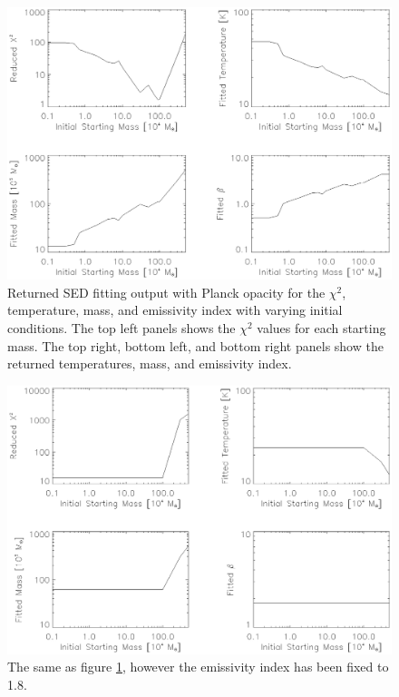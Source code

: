 \begin{figure}
  \centering
  \includegraphics[width=1.\textwidth]{sed_imgs/beta_f_return.eps}
  \caption[Initial Mass Dependence and Convergence of SED Fits for Region Fluxes and Variable Emissivity Index]{Returned SED fitting output with Planck opacity for the $\chi^2$, temperature, mass, and emissivity index with varying initial conditions.  The top left panels shows the $\chi^2$ values for each starting mass.  The top right, bottom left, and bottom right panels show the returned temperatures, mass, and emissivity index.}
  \label{fig:init_mass_bf}
\end{figure}

\begin{figure}
  \centering
  \includegraphics[width=1.\textwidth]{sed_imgs/beta_1_return.eps}
  \caption[Initial Mass Dependence and Convergence of SED Fits for Region Fluxes and Fixed Emissivity Index]{The same as figure \ref{fig:init_mass_bf}, however the emissivity index has been fixed to 1.8.}
  \label{fig:init_mass_b1}
\end{figure}

